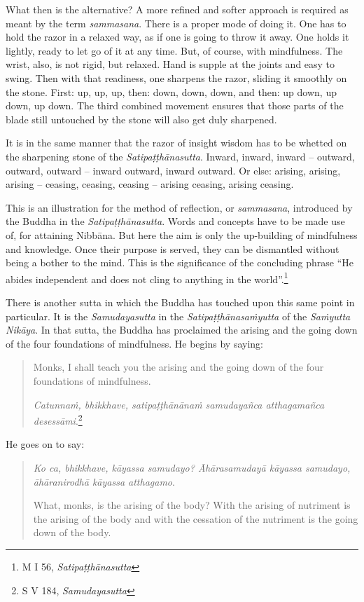What then is the alternative? A more refined and softer approach is required as meant by the term \emph{sammasana}. There is a proper mode of doing it. One has to hold the razor in a relaxed way, as if one is going to throw it away. One holds it lightly, ready to let go of it at any time. But, of course, with mindfulness. The wrist, also, is not rigid, but relaxed. Hand is supple at the joints and easy to swing. Then with that readiness, one sharpens the razor, sliding it smoothly on the stone. First: up, up, up, then: down, down, down, and then: up down, up down, up down. The third combined movement ensures that those parts of the blade still untouched by the stone will also get duly sharpened.

It is in the same manner that the razor of insight wisdom has to be whetted on the sharpening stone of the \emph{Satipaṭṭhānasutta}. Inward, inward, inward -- outward, outward, outward -- inward outward, inward outward. Or else: arising, arising, arising -- ceasing, ceasing, ceasing -- arising ceasing, arising ceasing.

This is an illustration for the method of reflection, or \emph{sammasana}, introduced by the Buddha in the \emph{Satipaṭṭhānasutta}. Words and concepts have to be made use of, for attaining Nibbāna. But here the aim is only the up-building of mindfulness and knowledge. Once their purpose is served, they can be dismantled without being a bother to the mind. This is the significance of the concluding phrase ``He abides independent and does not cling to anything in the world''.\footnote{M I 56, \emph{Satipaṭṭhānasutta}}

There is another sutta in which the Buddha has touched upon this same point in particular. It is the \emph{Samudayasutta} in the \emph{Satipaṭṭhānasaṁyutta} of the \emph{Saṁyutta Nikāya}. In that sutta, the Buddha has proclaimed the arising and the going down of the four foundations of mindfulness. He begins by saying:

\begin{quote}
Monks, I shall teach you the arising and the going down of the four foundations of mindfulness.

\emph{Catunnaṁ, bhikkhave, satipaṭṭhānānaṁ samudayañca atthagamañca desessāmi}.\footnote{S V 184, \emph{Samudayasutta}}
\end{quote}

He goes on to say:

\begin{quote}
\emph{Ko ca, bhikkhave, kāyassa samudayo? Āhārasamudayā kāyassa samudayo, āhāranirodhā kāyassa atthagamo}.

What, monks, is the arising of the body? With the arising of nutriment is the arising of the body and with the cessation of the nutriment is the going down of the body.
\end{quote}

